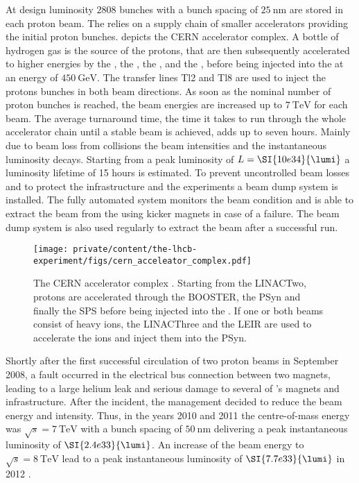 At design luminosity $\num{2808}$ bunches with a bunch spacing of
$\SI{25}{\nano\metre}$ are stored in each proton beam. The \LHC relies on a
supply chain of smaller accelerators providing the initial proton bunches.
 depicts the \acs{CERN}
accelerator complex. A bottle of hydrogen gas is the source of the protons, that
are then subsequently accelerated to higher energies by the \LINACTwo, the
\BOOSTER, the \PSyn, and the \SPS, before being injected into the \LHC at an
energy of $\SI{450}{\GeV}$. The transfer lines Tl2 and Tl8 are used to inject
the protons bunches in both beam directions. As soon as the nominal number of
proton bunches is reached, the beam energies are increased up to $\SI{7}{\TeV}$
for each beam. The average \LHC turnaround time, \ie the time it takes to run
through the whole accelerator chain until a stable beam is achieved, adds up to
seven hours. Mainly due to beam loss from \pp collisions the beam intensities
and the instantaneous luminosity decays. Starting from a peak luminosity of
$L=\SI{10e34}{\lumi}$ a luminosity lifetime of 15 hours is estimated. To prevent
uncontrolled beam losses and to protect the \LHC infrastructure and the \LHC
experiments a beam dump system is installed. The fully automated system monitors
the beam condition and is able to extract the beam from the \LHC using kicker
magnets in case of a failure. The beam dump system is also used regularly to
extract the beam after a successful run.

\begin{figure}[t]
  \texttt{[image: private/content/the-lhcb-experiment/figs/cern\_acceleator\_complex.pdf]}
  \caption{
  The \acs{CERN} accelerator complex \cite{Christiane:1260465}. 
  Starting from the \acs{LINACTwo}, protons are accelerated through the
  \acs{BOOSTER}, the \acs{PSyn} and finally the \acs{SPS} before being injected
  into the \LHC. If one or both beams consist of heavy ions, the
  \acs*{LINACThree} and the \acs*{LEIR} are used to accelerate the ions and inject
  them into the \acs{PSyn}.
  }
  \label{fig:lhcb_experiment:lhc:cern_accelerator_complex}
\end{figure}

Shortly after the first successful circulation of two proton beams in September
2008, a fault occurred in the electrical bus connection between two magnets,
leading to a large helium leak and serious damage to several of \LHC's magnets
and infrastructure. After the incident, the management decided to reduce the
beam energy and intensity. Thus, in the years 2010 and 2011 the \LHC
centre-of-mass energy was $\sqrt{s}=\SI{7}{\TeV}$ with a bunch spacing of
$\SI{50}{\nano\metre}$ delivering a peak instantaneous luminosity of
$\SI{2.4e33}{\lumi}$. An increase of the beam energy to $\sqrt{s}=\SI{8}{\TeV}$
lead to a peak instantaneous luminosity of $\SI{7.7e33}{\lumi}$ in 2012
\cite{Lamont:2013cma}.

